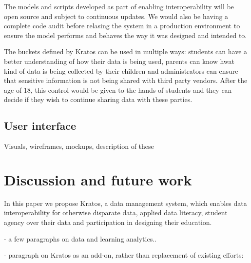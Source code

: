 \documentclass{article}
\begin{document}
\bigbreak
The models and scripts developed as part of enabling interoperability will be open source and subject to continuous updates. We would also be having a complete code audit before relasing the system in a production environment to ensure the model performs and behaves the way it was designed and intended to.

\bigbreak
The buckets defined by Kratos can be used in multiple ways: students can have a better understanding of how their data is being used, parents can know hwat kind of data is being collected by their children and administrators can ensure that sensitive information is not being shared with third party vendors. After the age of 18, this control would be given to the hands of students and they can decide if they wish to continue sharing data with these parties.

\subsection{User interface}
Visuals, wireframes, mockups, description of these

\section{Discussion and future work}
In this paper we propose Kratos, a data management system, which enables data interoperability for otherwise disparate data, applied data literacy, student agency over their data and participation in designing their education.

- a few paragraphs on data and learning analytics..

- paragraph on Kratos as an add-on, rather than replacement of existing efforts:
\end{document}

